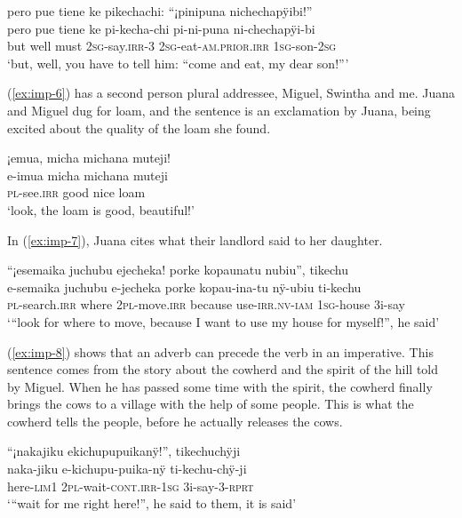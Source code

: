 \ea\label{ex:imp-5}
\begingl
\glpreamble pero pue tiene ke pikechachi: “¡pinipuna nichechapÿibi!”\\
\gla pero pue {tiene ke} pi-kecha-chi pi-ni-puna ni-chechapÿi-bi\\
\glb but well {must} 2\textsc{sg}-say.\textsc{irr}-3 2\textsc{sg}-eat-\textsc{am.prior.irr} 1\textsc{sg}-son-2\textsc{sg}\\
\glft ‘but, well, you have to tell him: “come and eat, my dear son!”’
\endgl
\trailingcitation{[cux-c120414ls-2.302]}
\xe

(\ref{ex:imp-6}) has a second person plural addressee, Miguel, Swintha and me. Juana and Miguel dug for loam, and the sentence is an exclamation by Juana, being excited about the quality of the loam she found.

\ea\label{ex:imp-6}
\begingl
\glpreamble ¡emua, micha michana muteji!\\
\gla e-imua micha michana muteji \\
\textsc{pl}-see.\textsc{irr} good nice loam \\
\glft ‘look, the loam is good, beautiful!’
\endgl
\trailingcitation{[jmx-d110918ls-1.089]}
\xe

In (\ref{ex:imp-7}), Juana cites what their landlord said to her daughter. 

\ea\label{ex:imp-7}
\begingl
\glpreamble “¡esemaika juchubu ejecheka! porke kopaunatu nubiu”, tikechu\\
\gla e-semaika juchubu e-jecheka porke kopau-ina-tu nÿ-ubiu ti-kechu\\
\textsc{pl}-search.\textsc{irr} where 2\textsc{pl}-move.\textsc{irr} because use-\textsc{irr.nv}-\textsc{iam} 1\textsc{sg}-house 3i-say\\
\glft ‘“look for where to move, because I want to use my house for myself!”, he said’
\endgl
\trailingcitation{[jxx-p120430l-1.397]}
\xe

(\ref{ex:imp-8}) shows that an adverb can precede the verb in an imperative. This sentence comes from the story about the cowherd and the spirit of the hill told by Miguel. When he has passed some time with the spirit, the cowherd finally brings the cows to a village with the help of some people. This is what the cowherd tells the people, before he actually releases the cows.

\ea\label{ex:imp-8}
\begingl 
\glpreamble “¡nakajiku ekichupupuikanÿ!”, tikechuchÿji\\
\gla naka-jiku e-kichupu-puika-nÿ ti-kechu-chÿ-ji\\ 
\glb here-\textsc{lim}1 2\textsc{pl}-wait-\textsc{cont}.\textsc{irr}-1\textsc{sg} 3i-say-3-\textsc{rprt}\\ 
\glft ‘“wait for me right here!”, he said to them, it is said’
\trailingcitation{[mxx-n151017l-1.81]}
\xe

